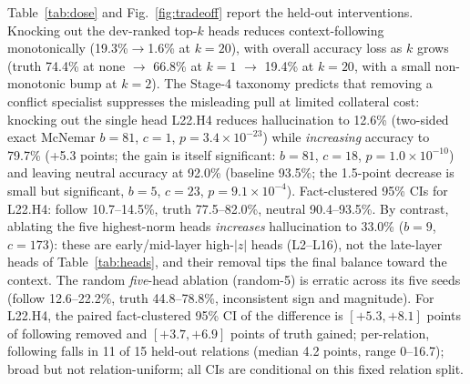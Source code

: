 \documentclass[paper]{ieice}
\newcommand{\spec}{L22.H4}
\begin{document}
Table~\ref{tab:dose} and Fig.~\ref{fig:tradeoff} report the held-out
interventions. Knocking out the dev-ranked top-$k$ heads reduces context-following
monotonically (19.3\%$\to$1.6\% at $k{=}20$), with overall accuracy
loss as $k$ grows (truth 74.4\% at none $\to$ 66.8\% at $k{=}1$
$\to$ 19.4\% at $k{=}20$, with a small non-monotonic bump at
$k{=}2$). The Stage-4 taxonomy predicts that removing a
conflict specialist suppresses the misleading pull at limited collateral
cost: knocking out the single
head \spec{} reduces hallucination to 12.6\% (two-sided exact McNemar
$b{=}81$, $c{=}1$, $p{=}3.4\times10^{-23}$) while \emph{increasing} accuracy to 79.7\% (+5.3 points;
the gain is itself significant: $b{=}81$, $c{=}18$, $p{=}1.0\times10^{-10}$)
and leaving neutral accuracy at 92.0\% (baseline 93.5\%; the 1.5-point
decrease is small but significant, $b{=}5$, $c{=}23$,
$p{=}9.1\times10^{-4}$). Fact-clustered 95\% CIs for \spec{}: follow
10.7--14.5\%, truth 77.5--82.0\%, neutral 90.4--93.5\%. By contrast,
ablating the five highest-norm heads \emph{increases} hallucination to
33.0\% ($b{=}9$, $c{=}173$): these are early/mid-layer high-$|z|$
heads (L2--L16), not the late-layer heads of Table~\ref{tab:heads}, and
their removal tips the final balance toward the context. The random \emph{five}-head ablation (random-5) is erratic across its
five seeds (follow 12.6--22.2\%, truth 44.8--78.8\%, inconsistent
sign and magnitude). For \spec{}, the paired
fact-clustered 95\% CI of the difference is $[+5.3, +8.1]$ points of
following removed and $[+3.7, +6.9]$ points of truth gained;
per-relation, following falls in 11 of 15 held-out relations
(median 4.2 points, range 0--16.7); broad but not relation-uniform;
all CIs are conditional on this fixed relation split.
\end{document}
